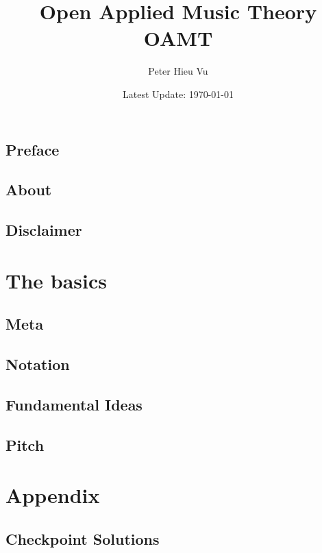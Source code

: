 \documentclass[12pt]{book}
\title{Open Applied Music Theory\\OAMT}
\author{Peter Hieu Vu}
\date{Latest Update: \today}
\renewcommand{\chaptermark}[1]{ \markboth{#1}{} }
\renewcommand{\sectionmark}[1]{ \markright{#1}{} }
\newcommand\onlyinsubfile[1]{#1}
\newcommand\notinsubfile[1]{}
\begin{document}
\renewcommand{\onlyinsubfile}[1]{}
\renewcommand{\notinsubfile}[1]{#1}

    \maketitle
    
    \frontmatter
    \chapter{Preface}\label{preface}
    
    
    \chapter{About}\label{about}
    
    
    \tableofcontents
    
    \chapter{Disclaimer}\label{disclaimer}
    
    
    \mainmatter
    \setcounter{chapter}{-1}
    \renewcommand{\chaptermark}[1]{ \markboth{Ch.\thechapter\enspace #1}{} }
    \renewcommand{\sectionmark}[1]{ \markright{\thesection\enspace #1}{} }
    
    \part{The basics}

        \chapter{Meta}\label{ch0}
            

        \chapter{Notation}\label{ch1}
            
            
        \chapter{Fundamental Ideas}\label{ch2}
            

        \chapter{Pitch}\label{ch3}
            
    
    \part{Appendix}


        \chapter*{Checkpoint Solutions}\label{checkpoints}
            
\end{document}
